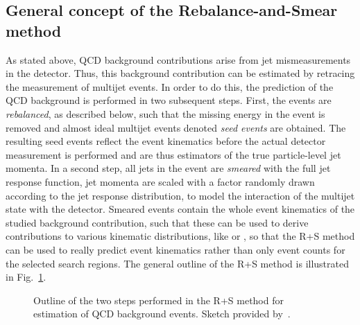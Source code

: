 \subsection{General concept of the Rebalance-and-Smear method}
\label{subsec:RPlusS_concept} 
As stated above, QCD background contributions arise from jet mismeasurements in the detector. Thus, this background contribution can be estimated by retracing the measurement of multijet events. In order to do this, the prediction of the QCD background is performed in two subsequent steps. First, the events are \textit{rebalanced}, as described below, such that the missing energy in the event is removed and almost ideal multijet events denoted \textit{seed events} are obtained. The resulting seed events reflect the event kinematics before the actual detector measurement is performed and are thus estimators of the true particle-level jet momenta. In a second step, all jets in the event are \textit{smeared} with the full jet response function, \ie jet momenta are scaled with a factor randomly drawn according to the jet response distribution, to model the interaction of the multijet state with the detector. Smeared events contain the whole event kinematics of the studied background contribution, such that these can be used to derive contributions to various kinematic distributions, like \HT or \MHT, so that the R+S method can be used to really predict event kinematics rather than only event counts for the selected search regions. The general outline of the R+S method is illustrated in Fig.~\ref{fig:RPlusS_concept}.
\begin{figure}[!t]
  \centering
  \caption{Outline of the two steps performed in the R+S method for estimation of QCD background events. Sketch provided by~\cite{MSchrode}.}
  \label{fig:RPlusS_concept}
\end{figure}
